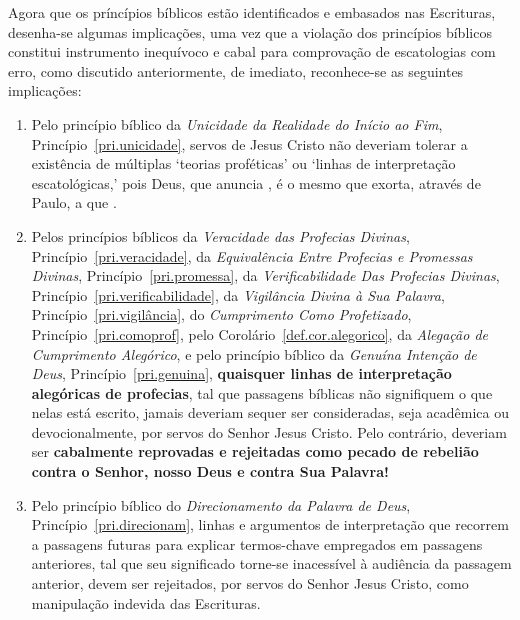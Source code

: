     Agora que os príncípios bíblicos estão identificados e embasados nas Escrituras, desenha-se algumas implicações, uma vez que
    a violação dos princípios bíblicos constitui instrumento inequívoco e cabal para comprovação de escatologias com erro,  como
    discutido anteriormente, de imediato, reconhece-se as seguintes implicações:

    \begin{enumerate}

        \item   Pelo   princípio   bíblico   da    \emph{Unicidade    da    Realidade    do    Início    ao    Fim},
            Princípio~\ref{pri.unicidade}, servos de Jesus Cristo não deveriam tolerar  a  existência  de  múltiplas
            `teorias proféticas' ou `linhas de interpretação escatológicas,' pois Deus, que anuncia ,
            é o mesmo que exorta, através de Paulo, a que .

        \item Pelos princípios bíblicos da \emph{Veracidade das Profecias Divinas},  Princípio~\ref{pri.veracidade},
            da  \emph{Equivalência  Entre  Profecias  e   Promessas   Divinas},   Princípio~\ref{pri.promessa},   da
            \emph{Verificabilidade Das Profecias Divinas}, Princípio~\ref{pri.verificabilidade}, da \emph{Vigilância
            Divina  à  Sua  Palavra},  Princípio~\ref{pri.vigilância},  do  \emph{Cumprimento   Como   Profetizado},
            Princípio~\ref{pri.comoprof}, pelo Corolário~\ref{def.cor.alegorico}, da \emph{Alegação  de  Cumprimento
            Alegórico}, e pelo princípio bíblico da \emph{Genuína Intenção  de  Deus},  Princípio~\ref{pri.genuina},
            \textbf{quaisquer linhas de interpretação alegóricas de  profecias},  tal  que  passagens  bíblicas  não
            signifiquem o que nelas está escrito,  jamais  deveriam  sequer  ser  consideradas,  seja  acadêmica  ou
            devocionalmente, por servos do Senhor Jesus Cristo.  Pelo  contrário,  deveriam  ser  \textbf{cabalmente
            reprovadas e rejeitadas como pecado de rebelião contra o Senhor, nosso Deus e contra Sua Palavra!}

        \item Pelo princípio bíblico do \emph{Direcionamento da Palavra  de  Deus},  Princípio~\ref{pri.direcionam},
            linhas e argumentos de interpretação  que  recorrem  a  passagens  futuras  para  explicar  termos-chave
            empregados em passagens anteriores, tal que seu significado torne-se inacessível à audiência da passagem
            anterior, devem ser rejeitados, por servos  do  Senhor  Jesus  Cristo,  como  manipulação  indevida  das
            Escrituras.

    \end{enumerate}


